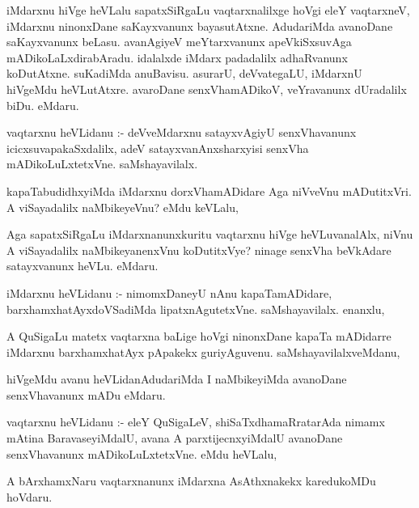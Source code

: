 \documentclass{article}
\begin{document}
\begin{mn}
iMdarxnu hiVge heVLalu  sapatxSiRgaLu vaqtarxnalilxge hoVgi eleY vaqtarxneV, 
iMdarxnu ninonxDane saKayxvanunx  bayasutAtxne.  AdudariMda avanoDane 
saKayxvanunx  beLasu. avanAgiyeV meYtarxvanunx  apeVkiSxsuvAga mADikoLaLxdirabAradu.  
idalalxde iMdarx padadalilx adhaRvanunx koDutAtxne. suKadiMda anuBavisu.  
asurarU,  deVvategaLU,  iMdarxnU  hiVgeMdu heVLutAtxre.  avaroDane  
senxVhamADikoV,  veYravanunx dUradalilx biDu. eMdaru.
\end{mn}

\begin{mn}
vaqtarxnu heVLidanu :- deVveMdarxnu satayxvAgiyU senxVhavanunx  icicxsuvapakaSxdalilx,  
adeV  satayxvanAnxsharxyisi  senxVha mADikoLuLxtetxVne. saMshayavilalx.
\end{mn}

\begin{mn}
kapaTabudidhxyiMda iMdarxnu  dorxVhamADidare Aga niVveVnu mADutitxVri.  
A viSayadalilx naMbikeyeVnu?  eMdu keVLalu, 
\end{mn}

\begin{mn}
Aga sapatxSiRgaLu iMdarxnanunxkuritu vaqtarxnu hiVge heVLuvanalAlx, niVnu 
A viSayadalilx  naMbikeyanenxVnu koDutitxVye?  ninage senxVha beVkAdare 
satayxvanunx heVLu.  eMdaru.
\end{mn}

\begin{mn}
iMdarxnu heVLidanu :- nimomxDaneyU nAnu kapaTamADidare, barxhamxhatAyxdoVSadiMda 
lipatxnAgutetxVne.  saMshayavilalx.  enanxlu,
\end{mn}

\begin{mn}
A QuSigaLu matetx vaqtarxna baLige hoVgi  ninonxDane kapaTa mADidarre  
iMdarxnu barxhamxhatAyx pApakekx guriyAguvenu. saMshayavilalxveMdanu,
\end{mn}

\begin{mn}
hiVgeMdu avanu heVLidanAdudariMda  I naMbikeyiMda avanoDane senxVhavanunx mADu eMdaru.
\end{mn}

\begin{mn}
vaqtarxnu heVLidanu :- eleY QuSigaLeV, shiSaTxdhamaRratarAda nimamx mAtina 
BaravaseyiMdalU, avana A parxtijecnxyiMdalU  avanoDane senxVhavanunx 
mADikoLuLxtetxVne.  eMdu heVLalu,
\end{mn}

\begin{mn}
A bArxhamxNaru vaqtarxnanunx iMdarxna AsAthxnakekx  karedukoMDu hoVdaru.
\end{mn}
\end{document}
